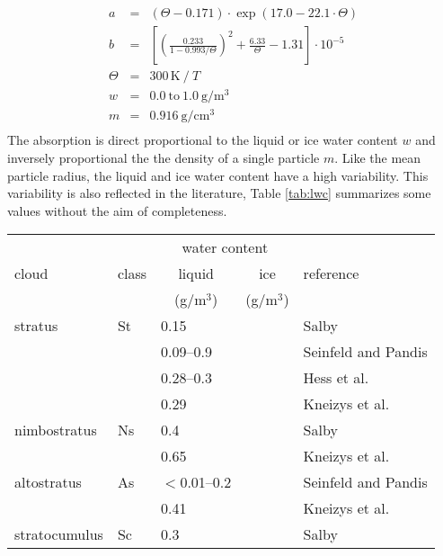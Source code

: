 {\begin{eqnarray}
%
  a       & = & (\Theta-0.171)\cdot\exp{(17.0-22.1\cdot\Theta)}\nonumber\\
  b       & = & \left[\left(\frac{0.233}{1-0.993/\Theta}\right)^2 + 
                \frac{6.33}{\Theta} - 1.31\right]\cdot10^{-5}\nonumber\\
%
  \Theta  & = & 300\,\mbox{K}~/~T\nonumber\\
%
  w       & = & 0.0~\mbox{to}~1.0~\mbox{g}/\mbox{m}^3 \nonumber\\
  m       & = & 0.916~\mbox{g}/\mbox{cm}^3\nonumber\\
  \nonumber
\end{eqnarray}
%
The absorption is direct proportional to the liquid or ice water
content $w$ and inversely proportional the the density of a single
particle $m$. Like the mean particle radius, the liquid and ice water
content have a high variability. This variability is also reflected in
the literature, Table \ref{tab:lwc} summarizes some values without the
aim of completeness.
\begin{table}[!htb]
\begin{center}
\begin{tabular}{lllll}
\hline
              &       & \multicolumn{2}{c}{water content} & \\
 cloud        & class & \multicolumn{1}{c}{liquid} & \multicolumn{1}{c}{ice} & reference \\
              &       & \multicolumn{1}{c}{(g/m$^3$)} & \multicolumn{1}{c}{(g/m$^3$)} & \\
\hline
 stratus      & St    & 0.15         &    & Salby \cite{salby:96}\\
              &       & 0.09--0.9    &    & Seinfeld and Pandis \cite{seinfeld:98}\\
              &       & 0.28--0.3    &    & Hess et al. \cite{hess:98}\\
              &       & 0.29         &    & Kneizys et al. \cite{abreu:96}\\
 nimbostratus & Ns    & 0.4          &    & Salby \cite{salby:96}\\
              &       & 0.65         &    & Kneizys et al. \cite{abreu:96}\\
 altostratus  & As    & $<$0.01--0.2 &    & Seinfeld and Pandis \cite{seinfeld:98}\\
              &       & 0.41         &    & Kneizys et al. \cite{abreu:96}\\
 stratocumulus& Sc    & 0.3          &    & Salby \cite{salby:96}\\

\end{tabular}
\end{center}
\end{table}}
